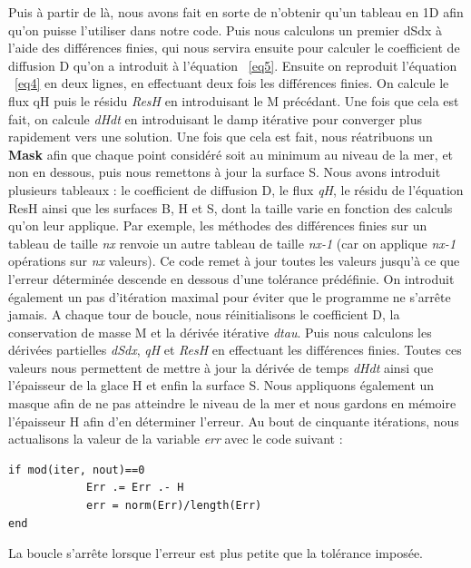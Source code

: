 \documentclass{article}
\begin{document}
Puis à partir de là, nous avons fait en sorte de n'obtenir qu'un tableau en 1D afin qu'on puisse l'utiliser dans notre code. Puis nous calculons un premier dSdx à l'aide des différences finies, qui nous servira ensuite pour calculer le coefficient de diffusion D qu'on a introduit à l'équation ~\eqref{eq5}. Ensuite on reproduit l'équation ~\eqref{eq4} en deux lignes, en effectuant deux fois les différences finies. On calcule le flux qH puis le résidu \textit{ResH} en introduisant le M précédant. Une fois que cela est fait, on calcule \textit{dHdt} en introduisant le damp itérative pour converger plus rapidement vers une solution. Une fois que cela est fait, nous réatribuons un \textbf{Mask} afin que chaque point considéré soit au minimum au niveau de la mer, et non en dessous, puis nous remettons à jour la surface S.
\newline
\newline
Nous avons introduit plusieurs tableaux : le coefficient de diffusion D, le flux \textit{qH}, le résidu de l'équation ResH ainsi que les surfaces B, H et S, dont la taille varie en fonction des calculs qu'on leur applique. Par exemple, les méthodes des différences finies sur un tableau de taille \textit{nx} renvoie un autre tableau de taille \textit{nx-1} (car on applique \textit{nx-1} opérations sur \textit{nx} valeurs).
\newline
\newline
Ce code remet à jour toutes les valeurs jusqu'à ce que l'erreur déterminée descende en dessous d'une tolérance prédéfinie. On introduit également un pas d'itération maximal pour éviter que le programme ne s'arrête jamais.
\newline
\newline
A chaque tour de boucle, nous réinitialisons le coefficient D, la conservation de masse M et la dérivée itérative \textit{dtau}. Puis nous calculons les dérivées partielles \textit{dSdx}, \textit{qH} et \textit{ResH} en effectuant les différences finies. Toutes ces valeurs nous permettent de mettre à jour la dérivée de temps \textit{dHdt} ainsi que l'épaisseur de la glace H et enfin la surface S. Nous appliquons également un masque afin de ne pas atteindre le niveau de la mer et nous gardons en mémoire l'épaisseur H afin d'en déterminer l'erreur.
\newline
Au bout de cinquante itérations, nous actualisons la valeur de la variable \textit{err} avec le code suivant :
\begin{verbatim}
if mod(iter, nout)==0 
            Err .= Err .- H
            err = norm(Err)/length(Err) 
end
\end{verbatim}
La boucle s'arrête lorsque l'erreur est plus petite que la tolérance imposée.
\newpage
\end{document}
